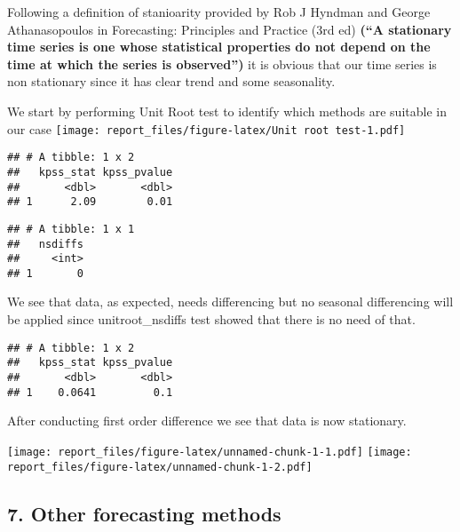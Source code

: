 \documentclass[
]{article}
\begin{document}
Following a definition of stanioarity provided by Rob J Hyndman and
George Athanasopoulos in Forecasting: Principles and Practice (3rd ed)
\textbf{(``A stationary time series is one whose statistical properties
do not depend on the time at which the series is observed'')} it is
obvious that our time series is non stationary since it has clear trend
and some seasonality.

We start by performing Unit Root test to identify which methods are
suitable in our case
\texttt{[image: report\_files/figure-latex/Unit root test-1.pdf]}

\begin{verbatim}
## # A tibble: 1 x 2
##   kpss_stat kpss_pvalue
##       <dbl>       <dbl>
## 1      2.09        0.01
\end{verbatim}

\begin{verbatim}
## # A tibble: 1 x 1
##   nsdiffs
##     <int>
## 1       0
\end{verbatim}

We see that data, as expected, needs differencing but no seasonal
differencing will be applied since unitroot\_nsdiffs test showed that
there is no need of that.

\begin{verbatim}
## # A tibble: 1 x 2
##   kpss_stat kpss_pvalue
##       <dbl>       <dbl>
## 1    0.0641         0.1
\end{verbatim}

After conducting first order difference we see that data is now
stationary.

\texttt{[image: report\_files/figure-latex/unnamed-chunk-1-1.pdf]}
\texttt{[image: report\_files/figure-latex/unnamed-chunk-1-2.pdf]}

\hypertarget{other-forecasting-methods}{%
\subsection{7. Other forecasting
methods}\label{other-forecasting-methods}}
\end{document}
